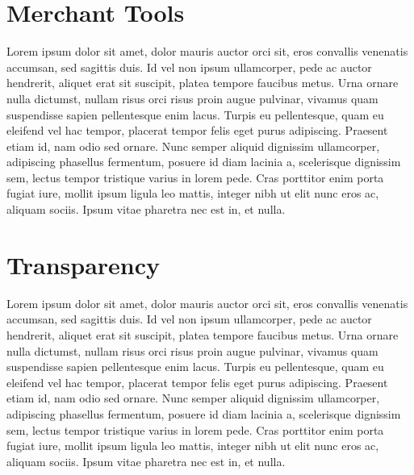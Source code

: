 \documentclass[letterpaper,10pt,openany,oneside,english]{sphinxmanual}
\begin{document}
\section{Merchant Tools}
\label{\detokenize{merchanttools:merchant-tools}}\label{\detokenize{merchanttools::doc}}
Lorem ipsum dolor sit amet, dolor mauris auctor orci sit, eros convallis venenatis accumsan, sed sagittis duis. Id vel non ipsum ullamcorper, pede ac auctor hendrerit, aliquet erat sit suscipit, platea tempore faucibus metus. Urna ornare nulla dictumst, nullam risus orci risus proin augue pulvinar, vivamus quam suspendisse sapien pellentesque enim lacus. Turpis eu pellentesque, quam eu eleifend vel hac tempor, placerat tempor felis eget purus adipiscing. Praesent etiam id, nam odio sed ornare. Nunc semper aliquid dignissim ullamcorper, adipiscing phasellus fermentum, posuere id diam lacinia a, scelerisque dignissim sem, lectus tempor tristique varius in lorem pede. Cras porttitor enim porta fugiat iure, mollit ipsum ligula leo mattis, integer nibh ut elit nunc eros ac, aliquam sociis. Ipsum vitae pharetra nec est in, et nulla.


\section{Transparency}
\label{\detokenize{transparency:transparency}}\label{\detokenize{transparency::doc}}
Lorem ipsum dolor sit amet, dolor mauris auctor orci sit, eros convallis venenatis accumsan, sed sagittis duis. Id vel non ipsum ullamcorper, pede ac auctor hendrerit, aliquet erat sit suscipit, platea tempore faucibus metus. Urna ornare nulla dictumst, nullam risus orci risus proin augue pulvinar, vivamus quam suspendisse sapien pellentesque enim lacus. Turpis eu pellentesque, quam eu eleifend vel hac tempor, placerat tempor felis eget purus adipiscing. Praesent etiam id, nam odio sed ornare. Nunc semper aliquid dignissim ullamcorper, adipiscing phasellus fermentum, posuere id diam lacinia a, scelerisque dignissim sem, lectus tempor tristique varius in lorem pede. Cras porttitor enim porta fugiat iure, mollit ipsum ligula leo mattis, integer nibh ut elit nunc eros ac, aliquam sociis. Ipsum vitae pharetra nec est in, et nulla.
\end{document}
